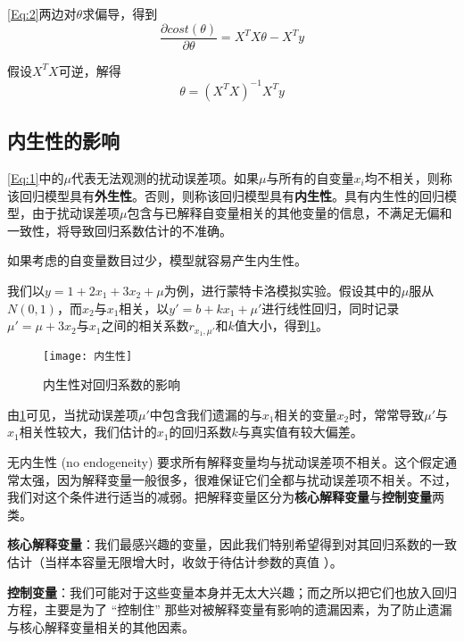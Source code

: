 \documentclass[withoutpreface]{cumcmthesis}
\begin{document}
\cref{Eq:2}两边对$\theta$求偏导，得到
\begin{equation}
  \frac{\partial{cost(\theta)}}{\partial{\theta}}=X^TX\theta - X^Ty
\end{equation}

假设$X^TX$可逆，解得
\begin{equation}
  \theta = (X^TX)^{-1}X^Ty
\end{equation}


\vspace{-0.8cm}
\subsection{内生性的影响}
\vspace{-0.2cm}
\cref{Eq:1}中的$\mu$代表无法观测的扰动误差项。如果$\mu$与所有的自变量$x_i$均不相关，则称该回归模型具有\textbf{外生性}。否则，则称该回归模型具有\textbf{内生性}。具有内生性的回归模型，由于扰动误差项$\mu$包含与已解释自变量相关的其他变量的信息，不满足无偏和一致性，将导致回归系数估计的不准确。

如果考虑的自变量数目过少，模型就容易产生内生性。

我们以$y=1+2x_1+3x_2+\mu$为例，进行蒙特卡洛模拟实验。假设其中的$\mu$服从$N(0,1)$，而$x_2$与$x_1$相关，以$y'=b+kx_1+\mu'$进行线性回归，同时记录$\mu' = \mu + 3x_2$与$x_1$之间的相关系数$r_{x_1,\mu'}$和$k$值大小，得到\cref{Fig:1}。

\begin{figure}[H]
  \centering
  \texttt{[image: 内生性]}
  \vspace{-0.3cm}
  \caption{内生性对回归系数的影响}\label{Fig:1}
\end{figure}

由\cref{Fig:1}可见，当扰动误差项$\mu'$中包含我们遗漏的与$x_1$相关的变量$x_2$时，常常导致$\mu'$与$x_1$相关性较大，我们估计的$x_1$的回归系数$k$与真实值有较大偏差。

无内生性 (no endogeneity) 要求所有解释变量均与扰动误差项不相关。这个假定通常太强，因为解释变量一般很多，很难保证它们全都与扰动误差项不相关。不过，我们对这个条件进行适当的减弱。把解释变量区分为\textbf{核心解释变量}与\textbf{控制变量}两类。

\textbf{核心解释变量}：我们最感兴趣的变量，因此我们特别希望得到对其回归系数的一致估计（当样本容量无限增大时，收敛于待估计参数的真值 ）。

\textbf{控制变量}：我们可能对于这些变量本身并无太大兴趣；而之所以把它们也放入回归方程，主要是为了 “控制住” 那些对被解释变量有影响的遗漏因素，为了防止遗漏与核心解释变量相关的其他因素。
\end{document}
